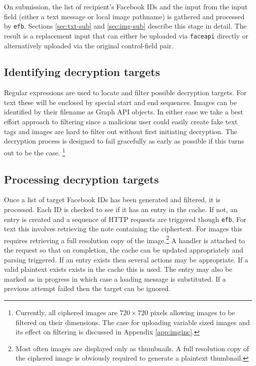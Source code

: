 On submission, the list of recipient's Facebook IDs and the input from the input field (either a text message or local image pathname) is gathered and processed by {\tt efb}. Sections \ref{sec:txt-sub} and \ref{sec:img-sub} describe this stage in detail. The result is a replacement input that can either be uploaded via {\tt faceapi} directly or alternatively uploaded via the original control-field pair.

\subsection{Identifying decryption targets}
\label{ssec:ident-targets}

Regular expressions are used to locate and filter possible decryption targets. For text these will be enclosed by special start and end sequences. Images can be identified by their filename as Graph API objects. In either case we take a best effort approach to filtering since a malicious user could easily create fake text tags and images are hard to filter out without first initiating decryption. The decryption process is designed to fail gracefully as early as possible if this turns out to be the case. \footnote{Currently, all ciphered images are $720 \times 720$ pixels allowing images to be filtered on their dimensions. The case for uploading variable sized images and its effect on filtering is discussed in Appendix \ref{app:imginc}.}

    
\subsection{Processing decryption targets}
\label{ssec:proc-targets}


Once a list of target Facebook IDs has been generated and filtered, it is processed. Each ID is checked to see if it has an entry in the cache. If not, an entry is created and a sequence of HTTP requests are triggered though {\tt efb}. For text this involves retrieving the note containing the ciphertext. For images this requires retrieving a full resolution copy of the image.\footnote{Most often images are displayed only as thumbnails. A full resolution copy of the ciphered image is obviously required to generate a plaintext thumbnail.} A handler is attached to the request so that on completion, the cache can be updated appropriately and parsing triggered. If an entry exists then several actions may be appropriate. If a valid plaintext exists exists in the cache this is used. The entry may also be marked as in progress in which case a loading message is substituted. If a previous attempt failed then the target can be ignored.

